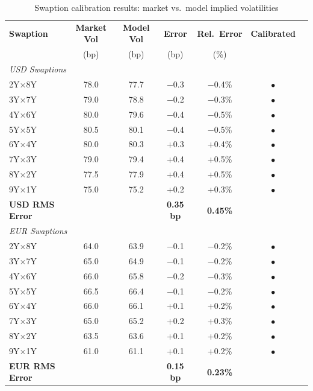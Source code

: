 \documentclass[conference]{IEEEtran}
\begin{document}
\begin{table}[!t]
\centering
\begin{tabular}{lcccccc}
\toprule
\textbf{Swaption} & \textbf{Market Vol} & \textbf{Model Vol} & \textbf{Error} & \textbf{Rel.\ Error} & \textbf{Calibrated} \\
 & (bp) & (bp) & (bp) & (\%) & \\
\midrule
\multicolumn{6}{l}{\textit{USD Swaptions}} \\
2Y$\times$8Y & 78.0 & 77.7 & $-$0.3 & $-$0.4\% & $\bullet$ \\
3Y$\times$7Y & 79.0 & 78.8 & $-$0.2 & $-$0.3\% & $\bullet$ \\
4Y$\times$6Y & 80.0 & 79.6 & $-$0.4 & $-$0.5\% & $\bullet$ \\
5Y$\times$5Y & 80.5 & 80.1 & $-$0.4 & $-$0.5\% & $\bullet$ \\
6Y$\times$4Y & 80.0 & 80.3 & +0.3 & +0.4\% & $\bullet$ \\
7Y$\times$3Y & 79.0 & 79.4 & +0.4 & +0.5\% & $\bullet$ \\
8Y$\times$2Y & 77.5 & 77.9 & +0.4 & +0.5\% & $\bullet$ \\
9Y$\times$1Y & 75.0 & 75.2 & +0.2 & +0.3\% & $\bullet$ \\
\midrule
\textbf{USD RMS Error} & & & \textbf{0.35 bp} & \textbf{0.45\%} & \\
\midrule
\multicolumn{6}{l}{\textit{EUR Swaptions}} \\
2Y$\times$8Y & 64.0 & 63.9 & $-$0.1 & $-$0.2\% & $\bullet$ \\
3Y$\times$7Y & 65.0 & 64.9 & $-$0.1 & $-$0.2\% & $\bullet$ \\
4Y$\times$6Y & 66.0 & 65.8 & $-$0.2 & $-$0.3\% & $\bullet$ \\
5Y$\times$5Y & 66.5 & 66.4 & $-$0.1 & $-$0.2\% & $\bullet$ \\
6Y$\times$4Y & 66.0 & 66.1 & +0.1 & +0.2\% & $\bullet$ \\
7Y$\times$3Y & 65.0 & 65.2 & +0.2 & +0.3\% & $\bullet$ \\
8Y$\times$2Y & 63.5 & 63.6 & +0.1 & +0.2\% & $\bullet$ \\
9Y$\times$1Y & 61.0 & 61.1 & +0.1 & +0.2\% & $\bullet$ \\
\midrule
\textbf{EUR RMS Error} & & & \textbf{0.15 bp} & \textbf{0.23\%} & \\
\bottomrule
\end{tabular}
\caption{Swaption calibration results: market vs.\ model implied volatilities}
\end{table}
\end{document}
